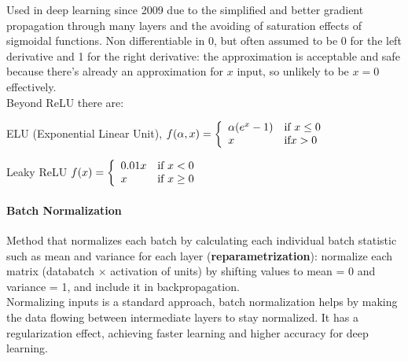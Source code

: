 \documentclass[10pt]{report}
\begin{document}
Used in deep learning since 2009 due to the simplified and better gradient propagation through many layers and the avoiding of saturation effects of sigmoidal functions. Non differentiable in 0, but often assumed to be 0 for the left derivative and 1 for the right derivative: the approximation is acceptable and safe because there's already an approximation for $x$ input, so unlikely to be $x=0$ effectively.\\
Beyond ReLU there are:
\begin{list}{}{}
	\item ELU (Exponential Linear Unit), $f(\alpha,x)=\left\{\begin{array}{l l}
	\alpha(e^x - 1)&\text{if }x \leq 0\\
	x&\text{if} x > 0
	\end{array}\right.$
	\item Leaky ReLU $f(x) = \left\{\begin{array}{l l}
	0.01x&\text{if }x < 0\\
	x&\text{if }x \geq 0 
	\end{array}\right.$
\end{list}
\paragraph{Batch Normalization} Method that normalizes each batch by calculating each individual batch statistic such as mean and variance for each layer (\textbf{reparametrization}): normalize each matrix (databatch $\times$ activation of units) by shifting values to mean = 0 and variance = 1, and include it in backpropagation.\\
Normalizing inputs is a standard approach, batch normalization helps by making the data flowing between intermediate layers to stay normalized. It has a regularization effect, achieving faster learning and higher accuracy for deep learning.
\end{document}
